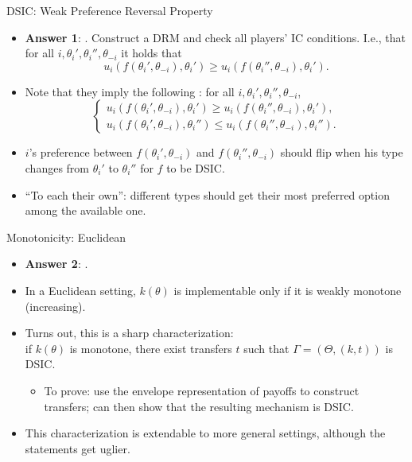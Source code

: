 \documentclass[english,10pt
,aspectratio=169
]{beamer}
\begin{document}
\begin{frame}{DSIC: Weak Preference Reversal Property}
	\begin{itemize}
		\item \textbf{Answer 1}: . Construct a DRM and check all players' \alert{IC conditions}. I.e., that for all $i,\theta_i',\theta_i'',\theta_{-i}$ it holds that
		$$ u_{i}(f(\theta_{i}', \theta_{-i}), \theta_{i}') \geq u_{i}(f(\theta_{i}'', \theta_{-i}), \theta_{i}').$$
		
		\item Note that they imply the following : for all $i,\theta_i',\theta_i'',\theta_{-i}$,
		\begin{equation*}
			\begin{cases}
				u_{i}(f(\theta_{i}', \theta_{-i}), \theta_{i}') \geq u_{i}(f(\theta_{i}'', \theta_{-i}), \theta_{i}'),
				\\
				u_{i}(f(\theta_{i}', \theta_{-i}), \theta_{i}'') \leq u_{i}(f(\theta_{i}'', \theta_{-i}), \theta_{i}'').
			\end{cases}
		\end{equation*}
		\item $i$'s preference between $f(\theta_{i}', \theta_{-i})$ and $f(\theta_{i}'', \theta_{-i})$ should flip when his type changes from $\theta_i'$ to $\theta_i''$ for $f$ to be DSIC. 
		\item ``To each their own'': different types should get their most preferred option among the available one.
	\end{itemize}
\end{frame}


\begin{frame}{Monotonicity: Euclidean}
	\begin{itemize}
		\item \textbf{Answer 2}: .
		\item In a Euclidean setting, $k(\theta)$ is implementable only if it is weakly monotone (increasing).
		\item Turns out, this is a sharp characterization: \\
		if $k(\theta)$ is monotone, there exist transfers $t$ such that $\Gamma = (\Theta, (k,t))$ is DSIC.
		\begin{itemize}
			\item To prove: use the envelope representation of payoffs to construct transfers; can then show that the resulting mechanism is DSIC.
		\end{itemize}
		\item This characterization is extendable to more general settings, although the statements get uglier.
	\end{itemize}
\end{frame}
\end{document}
